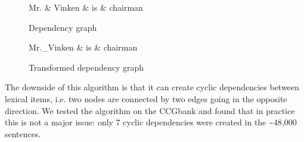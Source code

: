 \documentclass[output=paper]{langsci/langscibook}
\begin{document}
    \begin{multicols}{2}
        \begin{figure}[H]
            \begin{dependency}
                \begin{deptext}[column sep=1em]
                    Mr. \& Vinken \& is \& chairman \\
                \end{deptext}
            \end{dependency}
            \caption{Dependency graph\label{del:dep4}}
        \end{figure}
        \columnbreak
        \begin{figure}[H]
            \begin{dependency}
                \begin{deptext}[column sep=1em]
                    Mr.\_Vinken \& is \& chairman \\
                \end{deptext}
            \end{dependency}
            \caption{Transformed dependency graph\label{del:dep3}}
        \end{figure}
    \end{multicols}

    \indent The downside of this algorithm is that it can create cyclic dependencies between lexical items, i.e. two nodes are connected by two edges going in the opposite direction. We tested the algorithm on the CCGbank and found that in practice this is not a major issue: only 7 cyclic dependencies were created in the \textasciitilde 48,000 sentences.
\end{document}
